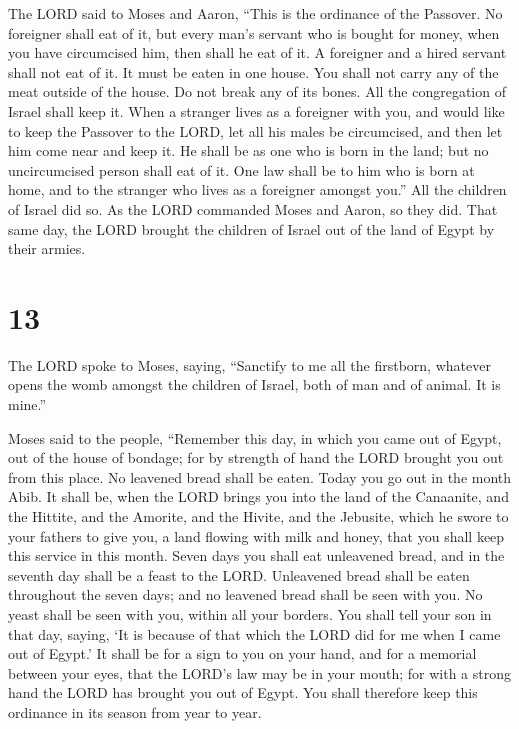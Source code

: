  The LORD said to Moses and Aaron, ``This is the
ordinance of the Passover. No foreigner shall eat of it, 
but every man's servant who is bought for money, when you have
circumcised him, then shall he eat of it.  A foreigner
and a hired servant shall not eat of it.  It must be
eaten in one house. You shall not carry any of the meat outside of the
house. Do not break any of its bones.  All the
congregation of Israel shall keep it.  When a stranger
lives as a foreigner with you, and would like to keep the Passover to
the LORD, let all his males be circumcised, and then let him come near
and keep it. He shall be as one who is born in the land; but no
uncircumcised person shall eat of it.  One law shall be
to him who is born at home, and to the stranger who lives as a foreigner
amongst you.''  All the children of Israel did so. As the
LORD commanded Moses and Aaron, so they did.  That same
day, the LORD brought the children of Israel out of the land of Egypt by
their armies.

\hypertarget{section-12}{%
\section{13}\label{section-12}}

 The LORD spoke to Moses, saying, 
``Sanctify to me all the firstborn, whatever opens the womb amongst the
children of Israel, both of man and of animal. It is mine.''

 Moses said to the people, ``Remember this day, in which
you came out of Egypt, out of the house of bondage; for by strength of
hand the LORD brought you out from this place. No leavened bread shall
be eaten.  Today you go out in the month Abib.
 It shall be, when the LORD brings you into the land of
the Canaanite, and the Hittite, and the Amorite, and the Hivite, and the
Jebusite, which he swore to your fathers to give you, a land flowing
with milk and honey, that you shall keep this service in this month.
 Seven days you shall eat unleavened bread, and in the
seventh day shall be a feast to the LORD.  Unleavened
bread shall be eaten throughout the seven days; and no leavened bread
shall be seen with you. No yeast shall be seen with you, within all your
borders.  You shall tell your son in that day, saying, `It
is because of that which the LORD did for me when I came out of Egypt.'
 It shall be for a sign to you on your hand, and for a
memorial between your eyes, that the LORD's law may be in your mouth;
for with a strong hand the LORD has brought you out of Egypt.
 You shall therefore keep this ordinance in its season
from year to year.

